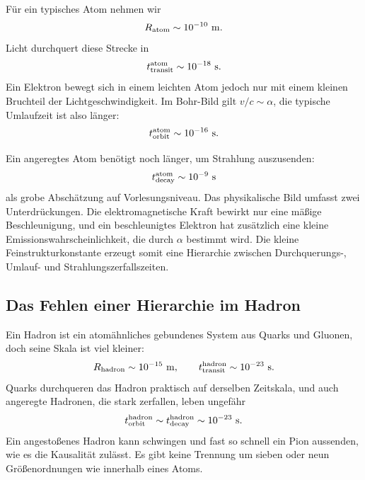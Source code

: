 Für ein typisches Atom nehmen wir
\begin{equation}
R_{\rm atom}\sim10^{-10}\ {\rm m}.
\end{equation}
Licht durchquert diese Strecke in
\begin{equation}
t_{\rm transit}^{\rm atom}\sim10^{-18}\ {\rm s}.
\end{equation}
Ein Elektron bewegt sich in einem leichten Atom jedoch nur mit einem kleinen Bruchteil der Lichtgeschwindigkeit. Im Bohr-Bild gilt \(v/c\sim\alpha\), die typische Umlaufzeit ist also länger:
\begin{equation}
t_{\rm orbit}^{\rm atom}\sim10^{-16}\ {\rm s}.
\end{equation}

Ein angeregtes Atom benötigt noch länger, um Strahlung auszusenden:
\begin{equation}
t_{\rm decay}^{\rm atom}\sim10^{-9}\ {\rm s}
\end{equation}
als grobe Abschätzung auf Vorlesungsniveau. Das physikalische Bild umfasst zwei Unterdrückungen. Die elektromagnetische Kraft bewirkt nur eine mäßige Beschleunigung, und ein beschleunigtes Elektron hat zusätzlich eine kleine Emissionswahrscheinlichkeit, die durch \(\alpha\) bestimmt wird. Die kleine Feinstrukturkonstante erzeugt somit eine Hierarchie zwischen Durchquerungs-, Umlauf- und Strahlungszerfallszeiten.

\subsection{Das Fehlen einer Hierarchie im Hadron}

Ein Hadron ist ein atomähnliches gebundenes System aus Quarks und Gluonen, doch seine Skala ist viel kleiner:
\begin{equation}
R_{\rm hadron}\sim10^{-15}\ {\rm m},
\qquad
t_{\rm transit}^{\rm hadron}\sim10^{-23}\ {\rm s}.
\end{equation}
Quarks durchqueren das Hadron praktisch auf derselben Zeitskala, und auch angeregte Hadronen, die stark zerfallen, leben ungefähr
\begin{equation}
t_{\rm orbit}^{\rm hadron}
\sim t_{\rm decay}^{\rm hadron}
\sim10^{-23}\ {\rm s}.
\end{equation}
Ein angestoßenes Hadron kann schwingen und fast so schnell ein Pion aussenden, wie es die Kausalität zulässt. Es gibt keine Trennung um sieben oder neun Größenordnungen wie innerhalb eines Atoms.

\begin{classroomqa}\end{classroomqa}

